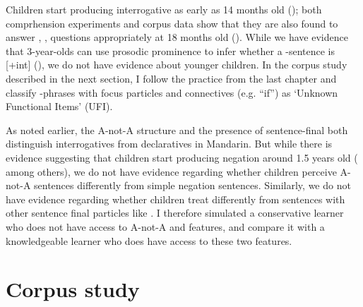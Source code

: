  Children start producing interrogative \twh{} as early as 14 months old (\cite{lee1989acq, fan2012, linjing2014}); both comprhension experiments and corpus data show that they are also found to answer , ,  questions appropriately at 18 months old (\citealt{fan2012,moradlou2020}). While we have evidence that 3-year-olds can use prosodic prominence to infer whether a \twh-sentence is [+int] (\cite{WHanything}), we do not have evidence about younger children. In the corpus study described in the next section, I follow the practice from the last chapter and classify \twh-phrases with focus particles and connectives (e.g.  ``if'') as `Unknown Functional Items' (UFI).

 As noted earlier, the A-not-A structure and the presence of sentence-final  both distinguish interrogatives from declaratives in Mandarin. But while there is evidence suggesting that children start producing negation around 1.5 years old (\cite{lee1982,fan2007,li2019neg, huang2022manchild} among others), we do not have evidence regarding whether children perceive A-not-A sentences differently from simple negation sentences. Similarly, we do not have evidence regarding whether children treat  differently from sentences with other sentence final particles like . I therefore simulated a conservative learner who does not have access to A-not-A and  features, and compare it with a knowledgeable learner who does have access to these two features. 





\section{Corpus study}
\label{sec:mancl:corpus}


